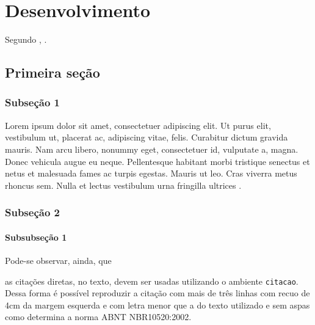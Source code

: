 %

\chapter{Desenvolvimento}
Segundo , \lipsum[2].

\section{Primeira seção}
\lipsum[4]

\subsection{Subseção 1}
Lorem ipsum dolor sit amet, consectetuer adipiscing elit. Ut purus elit, vestibulum ut, placerat ac,
adipiscing vitae, felis. Curabitur dictum gravida mauris. Nam arcu libero, nonummy eget, consectetuer
id, vulputate a, magna. Donec vehicula augue eu neque. Pellentesque habitant morbi tristique senectus
et netus et malesuada fames ac turpis egestas. Mauris ut leo. Cras viverra metus rhoncus sem. Nulla
et lectus vestibulum urna fringilla ultrices \cite{2007_montebelo}.

\subsection{Subseção 2}
\lipsum[3]

\subsubsection{Subsubseção 1}
Pode-se observar, ainda, que
\begin{citacao}
	as citações diretas, no texto, devem ser usadas utilizando o ambiente \texttt{citacao}. Dessa forma é possível reproduzir a citação com mais de três linhas com recuo de 4cm da margem esquerda e com letra menor que a do texto utilizado e sem aspas como determina a norma ABNT NBR10520:2002.
\end{citacao}

\lipsum[2]

